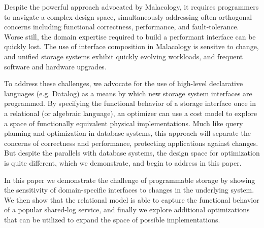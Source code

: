 Despite the powerful approach advocated by Malacology, it requires programmers
to navigate a complex design space, simultaneously addressing often orthogonal
concerns including functional correctness, performance, and fault-tolerance.
Worse still, the domain expertise required to build a performant interface can
be quickly lost. The use of interface composition in Malacology is sensitve to
change, and unified storage systems exhibit quickly evolving workloads, and
frequent software and hardware upgrades.

To address these challenges, we advocate for the use of high-level declarative
languages (e.g. Datalog) as a means by which new storage system interfaces are
programmed. By specifying the functional behavior of a storage interface once
in a relational (or algebraic language), an optimizer can use a cost model to
explore a space of functionally equivalent physical implementations. Much like
query planning and optimization in database systems, this approach will
separate the concerns of correctness and performance, protecting applications
against changes. But despite the parallels with database systems, the design
space for optimization is quite different, which we demonstrate, and begin to
address in this paper.

In this paper we demonstrate the challenge of programmable storage by showing
the sensitivity of domain-specific interfaces to changes in the underlying
system. We then show that the relational model is able to capture the
functional behavior of a popular shared-log service, and finally we explore
additional optimizations that can be utilized to expand the space of
possible implementations.
